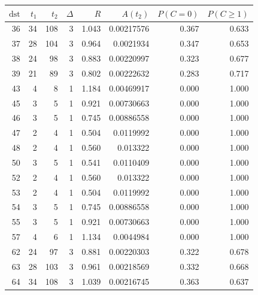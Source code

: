 \begin{tabular}{r r r r r r r r}
\toprule
$\mathrm{dst}$ & $t_1$ & $t_2$ & $\Delta$ & $R$ & $A(t_2)$ & $P(C=0)$ & $P(C\ge1)$ \\
\midrule
36 & 34 & 108 & 3 & 1.043 & 0.00217576 & 0.367 & 0.633 \\
37 & 28 & 104 & 3 & 0.964 & 0.0021934 & 0.347 & 0.653 \\
38 & 24 & 98 & 3 & 0.883 & 0.00220997 & 0.323 & 0.677 \\
39 & 21 & 89 & 3 & 0.802 & 0.00222632 & 0.283 & 0.717 \\
43 & 4 & 8 & 1 & 1.184 & 0.00469917 & 0.000 & 1.000 \\
45 & 3 & 5 & 1 & 0.921 & 0.00730663 & 0.000 & 1.000 \\
46 & 3 & 5 & 1 & 0.745 & 0.00886558 & 0.000 & 1.000 \\
47 & 2 & 4 & 1 & 0.504 & 0.0119992 & 0.000 & 1.000 \\
48 & 2 & 4 & 1 & 0.560 & 0.013322 & 0.000 & 1.000 \\
50 & 3 & 5 & 1 & 0.541 & 0.0110409 & 0.000 & 1.000 \\
52 & 2 & 4 & 1 & 0.560 & 0.013322 & 0.000 & 1.000 \\
53 & 2 & 4 & 1 & 0.504 & 0.0119992 & 0.000 & 1.000 \\
54 & 3 & 5 & 1 & 0.745 & 0.00886558 & 0.000 & 1.000 \\
55 & 3 & 5 & 1 & 0.921 & 0.00730663 & 0.000 & 1.000 \\
57 & 4 & 6 & 1 & 1.134 & 0.0044984 & 0.000 & 1.000 \\
62 & 24 & 97 & 3 & 0.881 & 0.00220303 & 0.322 & 0.678 \\
63 & 28 & 103 & 3 & 0.961 & 0.00218569 & 0.332 & 0.668 \\
64 & 34 & 108 & 3 & 1.039 & 0.00216745 & 0.363 & 0.637 \\
\bottomrule
\end{tabular}
